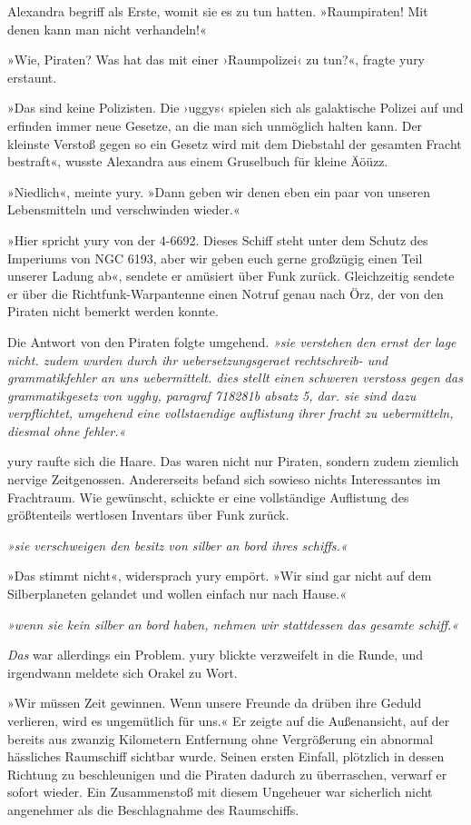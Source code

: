 Alexandra begriff als Erste, womit sie es zu tun hatten. »Raumpiraten! Mit denen kann man nicht verhandeln!«

»Wie, Piraten? Was hat das mit einer ›Raumpolizei‹ zu tun?«, fragte yury erstaunt.

»Das sind keine Polizisten. Die ›uggys‹ spielen sich als galaktische Polizei auf und erfinden immer neue Gesetze, an die man sich unmöglich halten kann. Der kleinste Verstoß gegen so ein Gesetz wird mit dem Diebstahl der gesamten Fracht bestraft«, wusste Alexandra aus einem Gruselbuch für kleine Äöüzz.

»Niedlich«, meinte yury. »Dann geben wir denen eben ein paar von unseren Lebensmitteln und verschwinden wieder.«

»Hier spricht yury von der 4-6692. Dieses Schiff steht unter dem Schutz des Imperiums von NGC 6193, aber wir geben euch gerne großzügig einen Teil unserer Ladung ab«, sendete er amüsiert über Funk zurück. Gleichzeitig sendete er über die Richtfunk-Warpantenne einen Notruf genau nach Örz, der von den Piraten nicht bemerkt werden konnte.

Die Antwort von den Piraten folgte umgehend. \textit{»sie verstehen den ernst der lage nicht. zudem wurden durch ihr uebersetzungsgeraet rechtschreib- und grammatikfehler an uns uebermittelt. dies stellt einen schweren verstoss gegen das grammatikgesetz von ugghy, paragraf 718281b absatz 5, dar. sie sind dazu verpflichtet, umgehend eine vollstaendige auflistung ihrer fracht zu uebermitteln, diesmal ohne fehler.«}

yury raufte sich die Haare. Das waren nicht nur Piraten, sondern zudem ziemlich nervige Zeitgenossen. Andererseits befand sich sowieso nichts Interessantes im Frachtraum. Wie gewünscht, schickte er eine vollständige Auflistung des größtenteils wertlosen Inventars über Funk zurück.

\textit{»sie verschweigen den besitz von silber an bord ihres schiffs.«}

»Das stimmt nicht«, widersprach yury empört. »Wir sind gar nicht auf dem Silberplaneten gelandet und wollen einfach nur nach Hause.«

\textit{»wenn sie kein silber an bord haben, nehmen wir stattdessen das gesamte schiff.«}

\textit{Das} war allerdings ein Problem. yury blickte verzweifelt in die Runde, und irgendwann meldete sich Orakel zu Wort.

»Wir müssen Zeit gewinnen. Wenn unsere Freunde da drüben ihre Geduld verlieren, wird es ungemütlich für uns.« Er zeigte auf die Außenansicht, auf der bereits aus zwanzig Kilometern Entfernung ohne Vergrößerung ein abnormal hässliches Raumschiff sichtbar wurde. Seinen ersten Einfall, plötzlich in dessen Richtung zu beschleunigen und die Piraten dadurch zu überraschen, verwarf er sofort wieder. Ein Zusammenstoß mit diesem Ungeheuer war sicherlich nicht angenehmer als die Beschlagnahme des Raumschiffs.

